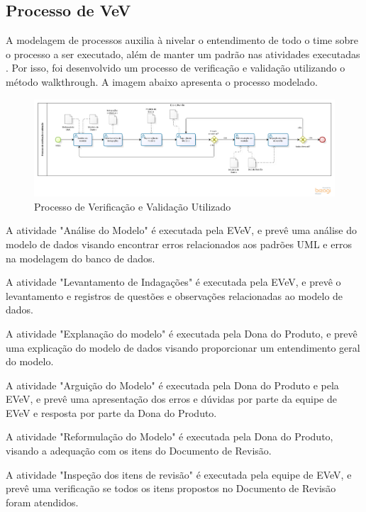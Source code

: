 \subsection{Processo de VeV}
A modelagem de processos auxilia à nivelar o entendimento de todo o time sobre o processo a ser executado, além de manter 
um padrão nas atividades executadas\cite{romano} . Por isso, foi 
desenvolvido um processo de verificação e validação utilizando o método walkthrough. A imagem abaixo apresenta o processo 
modelado.

\begin{figure}[!h]
\centering
\includegraphics[scale=0.55, angle = 90]{figuras/Processo_vv_walkthrough}
\caption[Processo de Verificação e Validação Utilizado]{Processo de Verificação e Validação Utilizado\footnotemark}
\end{figure}
\FloatBarrier

A atividade "Análise do Modelo" é executada pela EVeV, e prevê uma análise do modelo de dados visando encontrar erros 
relacionados aos padrões UML e erros na modelagem do banco de dados. 

A atividade "Levantamento de Indagações" é executada pela EVeV, e prevê o levantamento e registros de questões e 
observações relacionadas ao modelo de dados. 

A atividade "Explanação do modelo" é executada pela Dona do Produto, e prevê uma explicação do modelo de dados visando 
proporcionar um entendimento geral do modelo.

A atividade "Arguição do Modelo" é executada pela Dona do Produto e pela EVeV, e prevê uma apresentação dos erros e 
dúvidas por parte da equipe de EVeV e resposta por parte da Dona do Produto.

A atividade "Reformulação do Modelo" é executada pela Dona do Produto, visando a adequação com os itens do Documento de 
Revisão.

A atividade "Inspeção dos itens de revisão" é executada pela equipe de EVeV, e prevê uma verificação se todos os itens 
propostos no Documento de Revisão foram atendidos.

